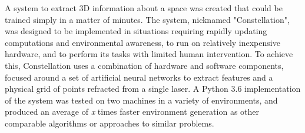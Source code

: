 A system to extract 3D information about a space was created that could be trained simply in a matter of minutes. The system, nicknamed "Constellation", was designed to be implemented in situations requiring rapidly updating computations and environmental awareness, to run on relatively inexpensive hardware, and to perform its tasks with limited human intervention. To achieve this, Constellation uses a combination of hardware and software components, focused around a set of artificial neural networks to extract features and a physical grid of points refracted from a single laser. A Python 3.6 implementation of the system was tested on two machines in a variety of environments, and produced an average of \textit{x} times faster environment generation as other comparable algorithms or approaches to similar problems.